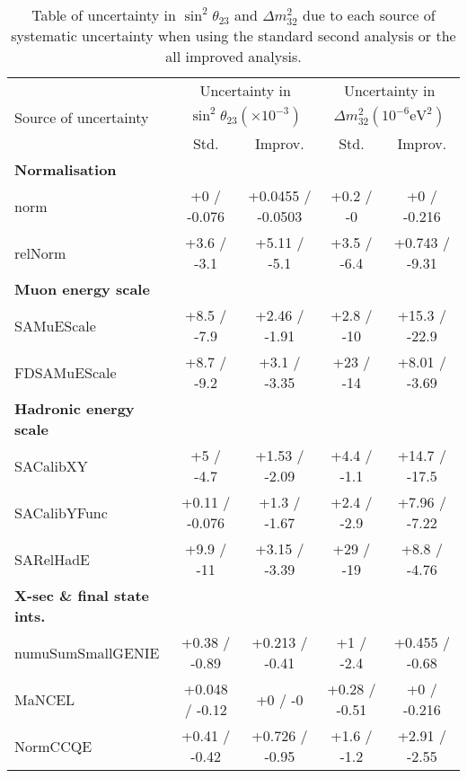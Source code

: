 \begin{table*}[t]
  \centering
  \caption{
    Table of uncertainty in $\sin^2\!\theta_{23}$ and $\Delta
    m^2_{32}$ due to each source of systematic uncertainty when
    using the standard second analysis or the all improved
    analysis. 
  }
  \begin{tabular}{l c c c c}
    \hline 
    \multirow{3}{*}{Source of uncertainty}&
                                            \multicolumn{2}{c}{Uncertainty
                                            in}
    &\multicolumn{2}{c}{Uncertainty in}\\ 
                                          &  \multicolumn{2}{c}{$\sin^2\!\theta_{23}(\times
                                            10^{-3})$}  &
                                                          \multicolumn{2}{c}{$\Delta
                                                          m^2_{32}\left(10^{-6}\text{eV}^{2}\right)$}\\ 
                                          & Std. & Improv. & Std. & Improv. \\ 
    \hline 
    \textbf{Normalisation} & & \\
    norm & +0 / -0.076  & +0.0455 / -0.0503 & +0.2 / -0 & +0 / -0.216\\
    relNorm & +3.6 / -3.1 & +5.11 / -5.1 & +3.5 / -6.4 & +0.743 / -9.31\\
    \textbf{Muon energy scale} & & \\
    SAMuEScale & +8.5 / -7.9 & +2.46 / -1.91 & +2.8 / -10 & +15.3 / -22.9\\
    FDSAMuEScale & +8.7 / -9.2 & +3.1 / -3.35 & +23 / -14 & +8.01 / -3.69\\
    \textbf{Hadronic energy scale} & & \\
    SACalibXY & +5 / -4.7 & +1.53 / -2.09 & +4.4 / -1.1 & +14.7 / -17.5\\
    SACalibYFunc & +0.11 / -0.076 & +1.3 / -1.67 & +2.4 / -2.9 & +7.96 / -7.22\\
    SARelHadE & +9.9 / -11 & +3.15 / -3.39 & +29 / -19 & +8.8 / -4.76\\
    \textbf{X-sec \& final state ints.} & & \\
    numuSumSmallGENIE & +0.38 / -0.89  & +0.213 / -0.41 & +1 / -2.4 & +0.455 / -0.68\\
    MaNCEL & +0.048 / -0.12  & +0 / -0 & +0.28 / -0.51 & +0 / -0.216\\
    NormCCQE & +0.41 / -0.42  & +0.726 / -0.95 & +1.6 / -1.2  & +2.91 / -2.55\\

\end{tabular}
\end{table*}
